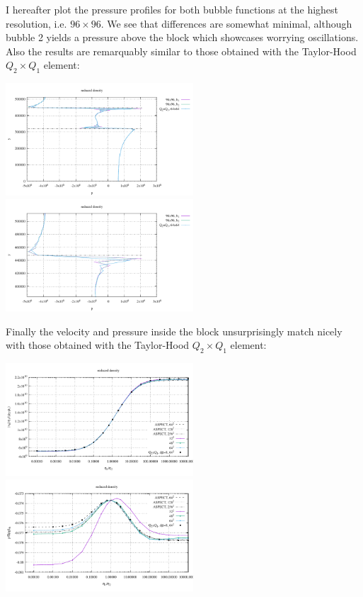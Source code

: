 I hereafter plot the pressure profiles for both bubble functions at the highest resolution, i.e. $96\times 96$.
We see that differences are somewhat minimal, although bubble 2 yields a pressure above the block which 
showcases worrying oscillations. Also the results are remarquably similar to those obtained with the Taylor-Hood
$Q_2\times Q_1$ element:

\begin{center}
\includegraphics[width=7cm]{python_codes/fieldstone_72/results/block/reduced/plines_b12}
\includegraphics[width=7cm]{python_codes/fieldstone_72/results/block/reduced/plines_b12_zoom}
\end{center}

Finally the velocity and pressure inside the block unsurprisingly match nicely with those obtained with the Taylor-Hood
$Q_2\times Q_1$ element:

\begin{center}
\includegraphics[width=7cm]{python_codes/fieldstone_72/results/block/reduced/results_v}
\includegraphics[width=7cm]{python_codes/fieldstone_72/results/block/reduced/results_p}
\end{center}



